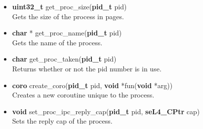 \documentclass[12pt]{article}
\begin{document}
\begin{itemize}
\item \textbf{uint32\_t} get\_proc\_size(\textbf{pid\_t} pid)\\
Gets the size of the process in pages.
\item \textbf{char} * get\_proc\_name(\textbf{pid\_t} pid)\\
Gets the name of the process.
\item \textbf{char} get\_proc\_taken(\textbf{pid\_t} pid)\\
Returns whether or not the pid number is in use.
\item \textbf{coro} create\_coro(\textbf{pid\_t} pid, \textbf{void} *fun(\textbf{void} *arg))\\
Creates a new coroutine unique to the process.
\item \textbf{void} set\_proc\_ipc\_reply\_cap(\textbf{pid\_t} pid, \textbf{seL4\_CPtr} cap)\\
Sets the reply cap of the process.
\end{itemize}
\end{document}
